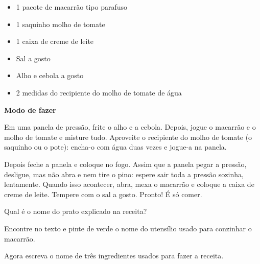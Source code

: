 
\begin{itemize}
\item 1 pacote de macarrão tipo parafuso

\item 1 saquinho molho de tomate

\item 1 caixa de creme de leite

\item Sal a gosto

\item Alho e cebola a gosto

\item 2 medidas do recipiente do molho de tomate de água

\end{itemize}

\textbf{Modo de fazer}

Em uma panela de pressão, frite o alho e a cebola. Depois, jogue o
macarrão e o molho de tomate e misture tudo. Aproveite o recipiente
do molho de tomate (o saquinho ou o pote): encha-o com água duas vezes
e jogue-a na panela.

Depois feche a panela e coloque no fogo. Assim que a panela pegar a
pressão, desligue, mas não abra e nem tire o pino: espere sair toda 
a pressão sozinha, lentamente. Quando isso acontecer, abra, mexa o
macarrão e coloque a caixa de creme de leite. Tempere com o sal a gosto.
Pronto! É só comer. 


\begin{escolha}
\item Qual é o nome do prato explicado na receita?


\item Encontre no texto e pinte de verde o nome do utensílio usado para
conzinhar o macarrão.


\item Agora escreva o nome de três ingredientes usados para fazer a receita.

\end{escolha}

